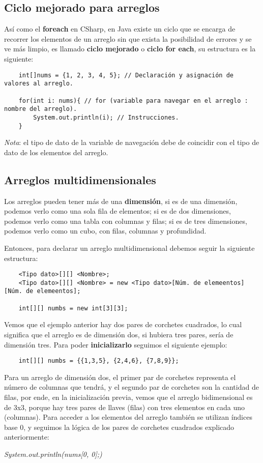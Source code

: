 \subsection{Ciclo mejorado para arreglos}

Así como el \textbf{foreach} en CSharp, en Java existe un ciclo que se encarga de recorrer los elementos de un arreglo sin que exista la posibilidad de errores y se ve más limpio, es llamado \textbf{ciclo mejorado} o \textbf{ciclo for each}, su estructura es la siguiente:
\begin{lstlisting}
    int[]nums = {1, 2, 3, 4, 5}; // Declaración y asignación de valores al arreglo.
        
    for(int i: nums){ // for (variable para navegar en el arreglo : nombre del arreglo).
        System.out.println(i); // Instrucciones.
    }
\end{lstlisting}

\textit{Nota}: el tipo de dato de la variable de navegación debe de coincidir con el tipo de dato de los elementos del arreglo.


\subsection{Arreglos multidimensionales}

Los arreglos pueden tener más de una \textbf{dimensión}, si es de una dimensión, podemos verlo como una sola fila de elementos; si es de dos dimensiones, podemos verlo como una tabla con columnas y filas; si es de tres dimensiones, podemos verlo como un cubo, con filas, columnas y profundidad.

Entonces, para declarar un arreglo multidimensional debemos seguir la siguiente estructura:
\begin{lstlisting}
    <Tipo dato>[][] <Nombre>;
    <Tipo dato>[][] <Nombre> = new <Tipo dato>[Núm. de elemeentos][Núm. de elemeentos];

    int[][] numbs = new int[3][3];
\end{lstlisting}

Vemos que el ejemplo anterior hay dos pares de corchetes cuadrados, lo cual significa que el arreglo es de dimensión dos, si hubiera tres pares, sería de dimensión tres. Para poder \textbf{inicializarlo} seguimos el siguiente ejemplo:
\begin{lstlisting}
    int[][] numbs = {{1,3,5}, {2,4,6}, {7,8,9}};
\end{lstlisting}

Para un arreglo de dimensión dos, el primer par de corchetes representa el número de columnas que tendrá, y el segundo par de corchetes son la cantidad de filas, por ende, en la inicialización previa, vemos que el arreglo bidimensional es de 3x3, porque hay tres pares de llaves (filas) con tres elementos en cada uno (columnas).
Para acceder a los elementos del arreglo también se utilizan índices base 0, y seguimos la lógica de los pares de corchetes cuadrados explicado anteriormente:
\begin{center}
    \textit{System.out.println(nums[0, 0];)}
\end{center}
